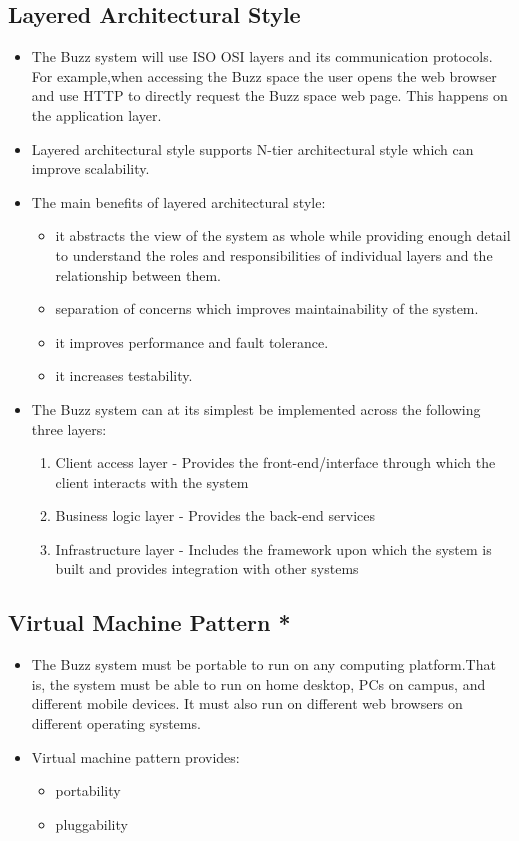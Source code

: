 \documentclass[12pt, oneside]{article}
\begin{document}
	\subsection{Layered Architectural Style}
	\begin{itemize}
		\item The Buzz system will use ISO OSI layers and its communication protocols. For example,when accessing the Buzz space the user opens the web browser and use HTTP to directly request the Buzz space web page. This happens on the application layer.
		\item Layered architectural style supports N-tier architectural style which can improve scalability.
		\item The main benefits of layered architectural style:
			\begin{itemize}
			\item it abstracts the view of the system as whole while providing enough detail to understand the roles and responsibilities of individual layers and the relationship between them.
			\item separation of concerns which improves maintainability of the system.
			\item it improves performance and fault tolerance.
			\item it increases testability.
			\end{itemize}
		\item The Buzz system can at its simplest be implemented across the following three layers:
		\begin{enumerate}
		\item Client access layer - Provides the front-end/interface through which the client interacts with the system
		\item Business logic layer - Provides the back-end services
		\item Infrastructure layer - Includes the framework upon which the system is built and provides integration with other systems
		\end{enumerate}
	\end{itemize}
	\subsection{Virtual Machine Pattern *}
	\begin{itemize}
		\item The Buzz system must be portable to run on any computing platform.That is, the system must be able to run on home desktop, PCs on campus, and different mobile devices. It must also run on different web browsers on different operating systems.
		\item Virtual machine pattern provides:
		\begin{itemize}
			\item portability
			\item pluggability
		\end{itemize}
	\end{itemize}
\end{document}
